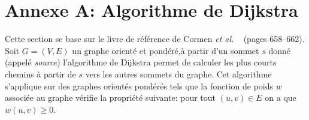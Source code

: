 

\section{Annexe A: Algorithme de Dijkstra}
\label{algo:dijkstra}
Cette section se base sur le livre de référence de Cormen \emph{et al.} ~\cite{Cormen:2009:IA:580470} (pages 658--662).\\

Soit $G = (V,E)$ un graphe orienté et pondéré,à partir d'un sommet $s$ donné (appelé \textit{source}) l'algorithme de Dijkstra permet de calculer les plus courts chemins à partir de $s$ vers les autres sommets du graphe. Cet algorithme s'applique sur des graphes orientés pondérés tels que la fonction de poids $w$ associée au graphe vérifie la propriété suivante: pour tout $(u,v)\in E$ on a que $w(u,v) \geq 0$.\\


